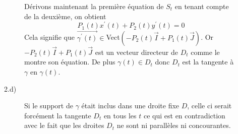 \begin{description}
\begin{description}
D\'{e}rivons maintenant la premi\`{e}re \'{e}quation de $S_{t}$ en tenant
compte de la deuxi\`{e}me, on obtient 
\[
P_{1}(t)x^{\prime }(t)+P_{2}(t)y^{\prime }(t)=0
\]
Cela signifie que $\overrightarrow{\gamma ^{\prime }(t)}\in $Vect$(-P_{2}(t)%
\overrightarrow{I}+P_{1}(t)\overrightarrow{J})$. Or $-P_{2}(t)%
\overrightarrow{I}+P_{1}(t)\overrightarrow{J}$ est un vecteur directeur de $%
D_{t}$ comme le montre son \'{e}quation. De plus $\gamma (t)\in D_{t}$ donc $%
D_{t}$ est la tangente \`{a} $\gamma $ en $\gamma (t)$.

\item[2.d)]  Si le support de $\gamma $ \'{e}tait inclus dans une droite
fixe $D$, celle ci serait forc\'{e}ment la tangente $D_{t}$ en tous les $t$
ce qui est en contradiction avec le fait que les droites $D_{t}$ ne sont ni
parall\`{e}les ni concourantes.


\end{description}
\end{description}
